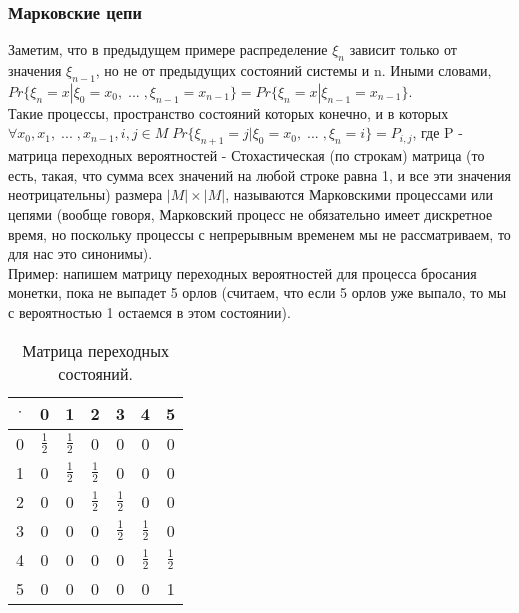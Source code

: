 \subsubsection{Марковские цепи}
Заметим, что в предыдущем примере распределение $\xi_n$ зависит только от значения $\xi_{n - 1}$, но не от предыдущих состояний системы и n. Иными словами, $Pr\{\xi_n = x | \xi_0 = x_0, \; ... \; , \xi_{n - 1} = x_{n - 1}\} = Pr\{\xi_n = x | \xi_{n - 1} = x_{n - 1}\}$.\\
Такие процессы, пространство состояний которых конечно, и в которых $\forall x_0, x_1, \; ... \; , x_{n - 1}, i, j \in M \; Pr\{\xi_{n + 1} = j | \xi_0 = x_0, \; ... \; , \xi_n = i\} = P_{i, j}$, где P - матрица переходных вероятностей - Стохастическая (по строкам) матрица (то есть, такая, что сумма всех значений на любой строке равна 1, и все эти значения неотрицательны) размера $|M| \times |M|$, называются Марковскими процессами или цепями (вообще говоря, Марковский процесс не обязательно имеет дискретное время, но поскольку процессы с непрерывным временем мы не рассматриваем, то для нас это синонимы).\\
Пример: напишем матрицу переходных вероятностей для процесса бросания монетки, пока не выпадет 5 орлов (считаем, что если 5 орлов уже выпало, то мы с вероятностью 1 остаемся в этом состоянии).\\
\begin{table}[H]
\caption{Матрица переходных состояний.}
\label{tabular:TransitionStatesMatrix}
\begin{center}
\begin{tabular}{|c|c|c|c|c|c|c|}
\hline
$\cdot$ & 0 & 1 & 2 & 3 & 4 & 5\\
\hline
0 & $\frac{1}{2}$ & $\frac{1}{2}$ & 0 & 0 & 0 & 0\\
\hline
1 & 0 & $\frac{1}{2}$ & $\frac{1}{2}$ & 0 & 0 & 0\\
\hline
2 & 0 & 0 & $\frac{1}{2}$ & $\frac{1}{2}$ & 0 & 0\\
\hline
3 & 0 & 0 & 0 & $\frac{1}{2}$ & $\frac{1}{2}$ & 0\\
\hline
4 & 0 & 0 & 0 & 0 & $\frac{1}{2}$ & $\frac{1}{2}$\\
\hline
5 & 0 & 0 & 0 & 0 & 0 & 1\\
\hline
\end{tabular}
\end{center}
\end{table}